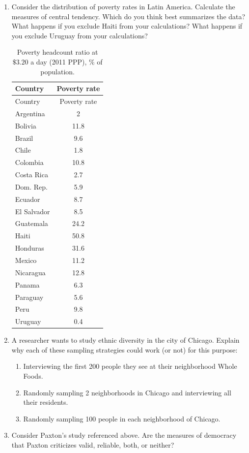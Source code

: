 \documentclass{book}
\begin{document}
\begin{enumerate}
\def\labelenumi{\arabic{enumi}.}
\item
  Consider the distribution of poverty rates in Latin America. Calculate the
  measures of central tendency. Which do you think best summarizes the data?
  What happens if you exclude Haiti from your calculations? What happens if
  you exclude Uruguay from your calculations?

  \begin{longtable}[]{@{}lc@{}}
  \caption{Poverty headcount ratio at \(\$3.20\) a day (2011 PPP), \% of
  population.}\tabularnewline
  \toprule()
  Country & Poverty rate \\
  \midrule()
  \endfirsthead
  \toprule()
  Country & Poverty rate \\
  \midrule()
  \endhead
  Argentina & 2 \\
  Bolivia & 11.8 \\
  Brazil & 9.6 \\
  Chile & 1.8 \\
  Colombia & 10.8 \\
  Costa Rica & 2.7 \\
  Dom. Rep. & 5.9 \\
  Ecuador & 8.7 \\
  El Salvador & 8.5 \\
  Guatemala & 24.2 \\
  Haiti & 50.8 \\
  Honduras & 31.6 \\
  Mexico & 11.2 \\
  Nicaragua & 12.8 \\
  Panama & 6.3 \\
  Paraguay & 5.6 \\
  Peru & 9.8 \\
  Uruguay & 0.4 \\
  \bottomrule()
  \end{longtable}
\item
  A researcher wants to study ethnic diversity in the city of Chicago. Explain
  why each of these sampling strategies could work (or not) for this purpose:

  \begin{enumerate}
  \def\labelenumii{\arabic{enumii}.}
  \item
    Interviewing the first 200 people they see at their neighborhood Whole
    Foods.
  \item
    Randomly sampling 2 neighborhoods in Chicago and interviewing all their
    residents.
  \item
    Randomly sampling 100 people in each neighborhood of Chicago.
  \end{enumerate}
\item
  Consider Paxton's study referenced above. Are the measures of democracy that
  Paxton criticizes valid, reliable, both, or neither?
\end{enumerate}
\end{document}
